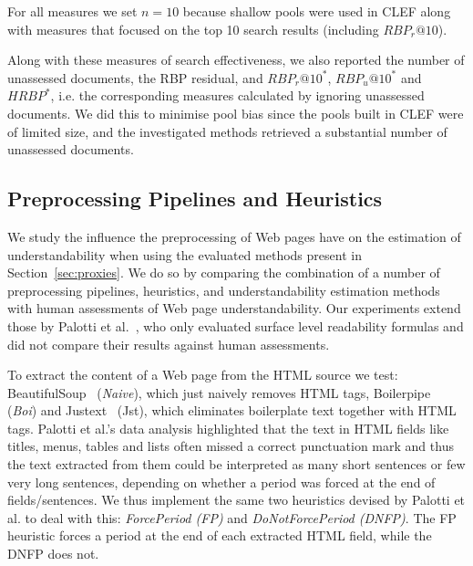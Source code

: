 \noindent For all measures we set $n=10$ because shallow pools were used in CLEF along with measures that focused on the top 10 search results (including $RBP_r@10$).

Along with these measures of search effectiveness, we also reported the number of unassessed documents, the RBP residual, and  $RBP_r@10^*$, $RBP_u@10^*$ and $HRBP^*$, i.e. the corresponding measures calculated by ignoring unassessed documents. We did this to minimise pool bias since the pools built in CLEF were of limited size, and the investigated methods retrieved a substantial number of unassessed documents.


\subsection{Preprocessing Pipelines and Heuristics}
\label{sec:pipelines}

We study the influence the preprocessing of Web pages have on the estimation of understandability when using the evaluated methods present in Section~\ref{sec:proxies}. We do so by comparing the combination of a number of preprocessing pipelines, heuristics, and understandability estimation methods with human assessments of Web page understandability. 
Our experiments extend those by Palotti et al.~\cite{palotti15}, who only evaluated surface level readability formulas and did not compare their results against human assessments. 

To extract the content of a Web page from the HTML source we test: BeautifulSoup~\cite{bs4} (\textit{Naive}), which just naively removes HTML tags, Boilerpipe~\cite{kohlschutter10} (\textit{Boi}) and Justext~\cite{jan11} ({Jst}), which eliminates boilerplate text together with HTML tags. 
Palotti et al.'s data analysis highlighted that the text in HTML fields like titles, menus, tables and lists often missed a correct punctuation mark and thus the text extracted from them
could be interpreted as many short sentences or few very long sentences, depending on whether a period was forced at the end of fields/sentences. We thus implement the same two heuristics devised by Palotti et al. to deal with this: \textit{ForcePeriod (FP)} and \textit{DoNotForcePeriod (DNFP)}. The FP heuristic forces a period at the end of each extracted HTML field, while the DNFP does not. 


